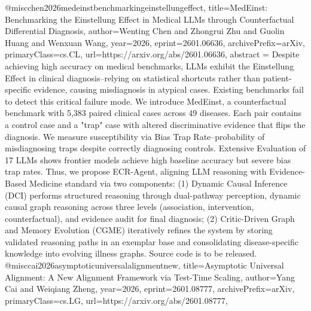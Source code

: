 {}@misc{chen2026medeinstbenchmarkingeinstellungeffect,
      title={MedEinst: Benchmarking the Einstellung Effect in Medical LLMs through Counterfactual Differential Diagnosis}, 
      author={Wenting Chen and Zhongrui Zhu and Guolin Huang and Wenxuan Wang},
      year={2026},
      eprint={2601.06636},
      archivePrefix={arXiv},
      primaryClass={cs.CL},
      url={https://arxiv.org/abs/2601.06636},
      abstract = {Despite achieving high accuracy on medical benchmarks, LLMs exhibit the Einstellung Effect in clinical diagnosis--relying on statistical shortcuts rather than patient-specific evidence, causing misdiagnosis in atypical cases. Existing benchmarks fail to detect this critical failure mode. We introduce MedEinst, a counterfactual benchmark with 5,383 paired clinical cases across 49 diseases. Each pair contains a control case and a "trap" case with altered discriminative evidence that flips the diagnosis. We measure susceptibility via Bias Trap Rate--probability of misdiagnosing traps despite correctly diagnosing controls. Extensive Evaluation of 17 LLMs shows frontier models achieve high baseline accuracy but severe bias trap rates. Thus, we propose ECR-Agent, aligning LLM reasoning with Evidence-Based Medicine standard via two components: (1) Dynamic Causal Inference (DCI) performs structured reasoning through dual-pathway perception, dynamic causal graph reasoning across three levels (association, intervention, counterfactual), and evidence audit for final diagnosis; (2) Critic-Driven Graph and Memory Evolution (CGME) iteratively refines the system by storing validated reasoning paths in an exemplar base and consolidating disease-specific knowledge into evolving illness graphs. Source code is to be released.}
}@misc{cai2026asymptoticuniversalalignmentnew,
      title={Asymptotic Universal Alignment: A New Alignment Framework via Test-Time Scaling}, 
      author={Yang Cai and Weiqiang Zheng},
      year={2026},
      eprint={2601.08777},
      archivePrefix={arXiv},
      primaryClass={cs.LG},
      url={https://arxiv.org/abs/2601.08777},
}
